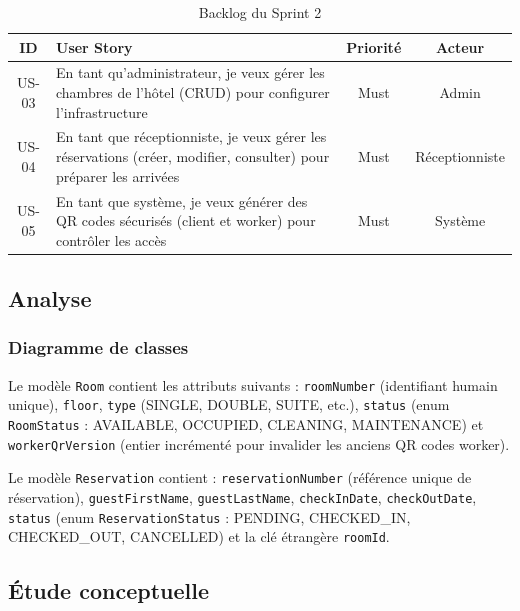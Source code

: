 \begin{table}[H]
\centering
\caption{Backlog du Sprint 2}
\label{tab:backlog_sprint2}
\begin{tabular}{|c|p{9cm}|c|c|}
\hline
\textbf{ID} & \textbf{User Story} & \textbf{Priorité} & \textbf{Acteur} \\
\hline
US-03 & En tant qu'administrateur, je veux gérer les chambres de l'hôtel (CRUD) pour configurer l'infrastructure & Must & Admin \\
\hline
US-04 & En tant que réceptionniste, je veux gérer les réservations (créer, modifier, consulter) pour préparer les arrivées & Must & Réceptionniste \\
\hline
US-05 & En tant que système, je veux générer des QR codes sécurisés (client et worker) pour contrôler les accès & Must & Système \\
\hline
\end{tabular}
\end{table}

\subsection{Analyse}

\subsubsection{Diagramme de classes}


Le modèle \texttt{Room} contient les attributs suivants : \texttt{roomNumber} (identifiant humain unique), \texttt{floor}, \texttt{type} (SINGLE, DOUBLE, SUITE, etc.), \texttt{status} (enum \texttt{RoomStatus} : AVAILABLE, OCCUPIED, CLEANING, MAINTENANCE) et \texttt{workerQrVersion} (entier incrémenté pour invalider les anciens QR codes worker).

Le modèle \texttt{Reservation} contient : \texttt{reservationNumber} (référence unique de réservation), \texttt{guestFirstName}, \texttt{guestLastName}, \texttt{checkInDate}, \texttt{checkOutDate}, \texttt{status} (enum \texttt{ReservationStatus} : PENDING, CHECKED\_IN, CHECKED\_OUT, CANCELLED) et la clé étrangère \texttt{roomId}.

\subsection{Étude conceptuelle}

